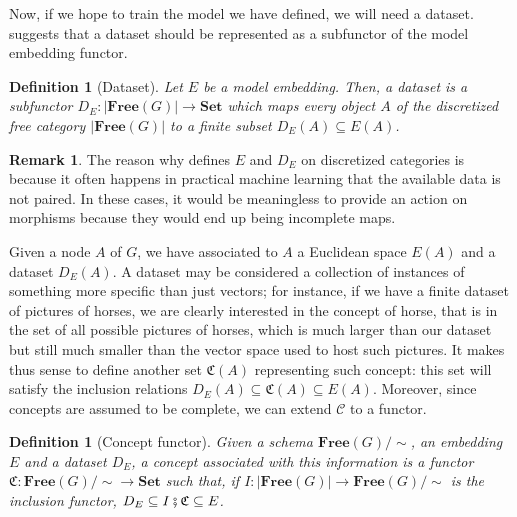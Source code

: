 \documentclass[11pt,a4paper,openright,twoside]{report}
\newcounter{mycounter}
\theoremstyle{plain}
\newtheorem{definition}[mycounter]{Definition}
\theoremstyle{definition}
\newtheorem{remark}[mycounter]{Remark}
\begin{document}
Now, if we hope to train the model we have defined, we will need a dataset. \cite{gavranovic2019compositional} suggests that a dataset should be represented as a subfunctor of the model embedding functor.

\begin{definition}[Dataset]
  Let $E$ be a model embedding. Then, a dataset is a subfunctor $D_E: |\mathbf{Free}(G)| \to \mathbf{Set}$ which maps every object $A$ of the discretized free category $|\mathbf{Free}(G)|$ to a finite subset $D_E(A) \subseteq E(A)$.
\end{definition}

\begin{remark}
  \label{rem: discretized}
  The reason why \cite{gavranovic2019compositional} defines $E$ and $D_E$ on discretized categories is because it often happens in practical machine learning that the available data is not paired. In these cases, it would be meaningless to provide an action on morphisms because they would end up being incomplete maps.
\end{remark}

Given a node $A$ of $G$, we have associated to $A$ a Euclidean space $E(A)$ and a dataset $D_E(A)$. A dataset may be considered a collection of instances of something more specific than just vectors; for instance, if we have a finite dataset of pictures of horses, we are clearly interested in the concept of horse, that is in the set of all possible pictures of horses, which is much larger than our dataset but still much smaller than the vector space used to host such pictures. It makes thus sense to define another set $\mathfrak{C}(A)$ representing such concept: this set will satisfy the inclusion relations $D_E(A) \subseteq \mathfrak{C}(A) \subseteq E(A)$. Moreover, since concepts are assumed to be complete, we can extend $\mathcal{C}$ to a functor.

\begin{definition}[Concept functor]
  Given a schema $\mathbf{Free}(G)/{\sim}$, an embedding $E$ and a dataset $D_E$, a concept associated with this information is a functor $\mathfrak{C}: \mathbf{Free}(G)/{\sim} \to \mathbf{Set}$ such that, if $I: |\mathbf{Free}(G)| \to \mathbf{Free}(G)/{\sim}$ is the inclusion functor, $D_E \subseteq I \fatsemi \mathfrak{C} \subseteq E$.
\end{definition}
\end{document}
